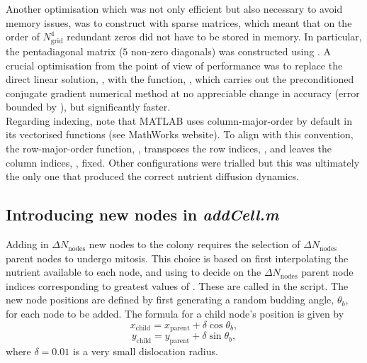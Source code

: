 Another optimisation which was not only efficient but also necessary to avoid
memory issues, was to construct  with sparse matrices, which 
meant that on the order of $N_{\textrm{grid}}^4$ redundant zeros did not have 
to be stored in memory. In particular, the pentadiagonal matrix ($5$ non-zero diagonals)
  was constructed using . A crucial optimisation 
from the point of view of performance was to 
replace the direct linear solution, , with the function, 
, which carries out the preconditioned conjugate 
gradient numerical method at no appreciable change in accuracy (error bounded by ),
but significantly faster.
\\

Regarding indexing, note that MATLAB uses column-major-order by default in 
its vectorised functions (see MathWorks website). To align with this convention,
the row-major-order function, , transposes the row indices, ,
and leaves the column indices, , fixed. Other configurations were 
trialled but this was ultimately the only one that produced the correct 
nutrient diffusion dynamics.

\subsection{Introducing new nodes in \textit{addCell.m}} \label{ssec:addCell}
Adding in $\Delta N_{\textrm{nodes}}$ new nodes to the colony requires the
selection of $\Delta N_{\textrm{nodes}}$ parent nodes to undergo 
mitosis. This choice is based on first interpolating the nutrient 
available to each node, and using  to decide on the 
$\Delta N_{\textrm{nodes}}$ parent node indices corresponding to 
greatest values of . These are called 
 in the  script. 
The new node positions are defined by first generating a random 
budding angle, $\theta_b$, for each node to be added. The formula for 
a child node's position is given by 
\begin{equation*}
x_{\textrm{child}} = x_{\textrm{parent}} + \delta \cos{\theta_b},
\end{equation*}
\begin{equation*}
y_{\textrm{child}} = y_{\textrm{parent}} + \delta \sin{\theta_b},
\end{equation*}
where $\delta = 0.01$ is a very small dislocation radius.
\\

